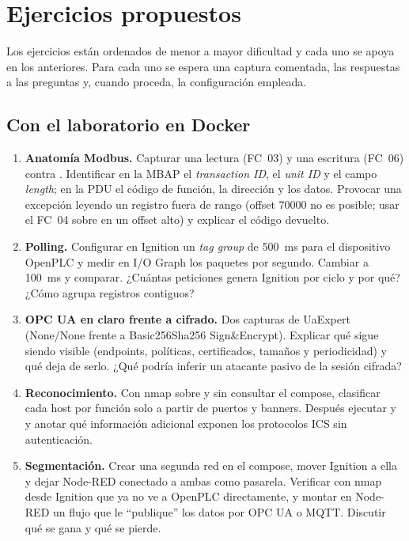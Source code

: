 \chapter{Ejercicios propuestos}
\label{cap:ejercicios}

Los ejercicios están ordenados de menor a mayor dificultad y cada uno se apoya en los anteriores. Para cada uno se espera una captura  comentada, las respuestas a las preguntas y, cuando proceda, la configuración empleada.

\section{Con el laboratorio en Docker}

\begin{enumerate}[label=\textbf{E\arabic*.},leftmargin=*,itemsep=4pt]
  \item \textbf{Anatomía Modbus.} Capturar una lectura (FC~03) y una escritura (FC~06) contra . Identificar en la MBAP el \emph{transaction ID}, el \emph{unit ID} y el campo \emph{length}; en la PDU el código de función, la dirección y los datos. Provocar una excepción leyendo un registro fuera de rango (offset 70000 no es posible; usar el FC~04 sobre  en un offset alto) y explicar el código devuelto.
  \item \textbf{Polling.} Configurar en Ignition un \emph{tag group} de 500~ms para el dispositivo OpenPLC y medir en I/O Graph los paquetes por segundo. Cambiar a 100~ms y comparar. ¿Cuántas peticiones genera Ignition por ciclo y por qué? ¿Cómo agrupa registros contiguos?
  \item \textbf{OPC UA en claro frente a cifrado.} Dos capturas de UaExpert (None/None frente a Basic256Sha256 Sign\&Encrypt). Explicar qué sigue siendo visible (endpoints, políticas, certificados, tamaños y periodicidad) y qué deja de serlo. ¿Qué podría inferir un atacante pasivo de la sesión cifrada?
  \item \textbf{Reconocimiento.} Con nmap sobre  y sin consultar el compose, clasificar cada host por función solo a partir de puertos y banners. Después ejecutar  y  y anotar qué información adicional exponen los protocolos ICS sin autenticación.
  \item \textbf{Segmentación.} Crear una segunda red  en el compose, mover Ignition a ella y dejar Node-RED conectado a ambas como pasarela. Verificar con nmap desde Ignition que ya no ve a OpenPLC directamente, y montar en Node-RED un flujo que le ``publique'' los datos por OPC UA o MQTT. Discutir qué se gana y qué se pierde.

\end{enumerate}
